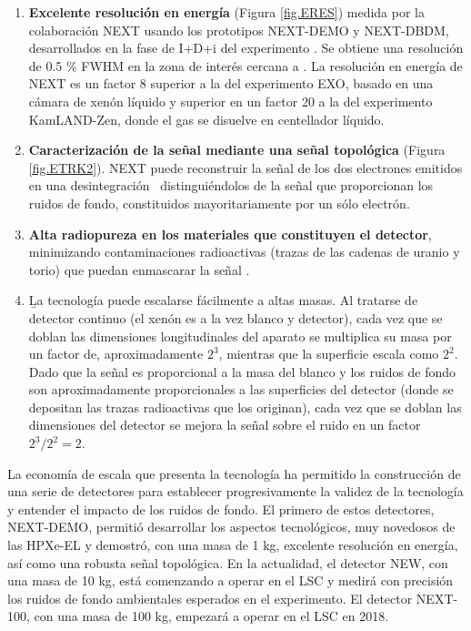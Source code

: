\begin{enumerate}
\item {\bf Excelente resolución en energía} (Figura \ref{fig.ERES}) medida por la colaboración NEXT usando los prototipos NEXT-DEMO y NEXT-DBDM, desarrollados en la fase de I+D+i del experimento . Se obtiene una resolución de 0.5 \% FWHM en la zona de interés cercana a \Qbb. La resolución en energía de NEXT es un factor 8 superior a la del experimento EXO, basado en una cámara de xenón líquido y superior en un factor 20 a la del experimento KamLAND-Zen, donde el gas se disuelve en centellador líquido. 
\item {\bf Caracterización de la señal mediante una señal topológica} (Figura \ref{fig.ETRK2}). NEXT puede reconstruir la señal de los dos electrones emitidos en una desintegración \bb\, distinguiéndolos de la señal que proporcionan los ruidos de fondo, constituidos mayoritariamente por un sólo electrón.
\item {\bf Alta radiopureza en los materiales que constituyen el detector}, minimizando contaminaciones radioactivas (trazas de las cadenas de uranio y torio) que puedan enmascarar la señal \bbonu.
\item {\b La tecnología puede escalarse fácilmente a altas masas}. Al tratarse de detector continuo (el xenón es a la vez blanco y detector), cada vez que se doblan las dimensiones longitudinales del aparato se multiplica su masa por un factor de, aproximadamente $2^3$, mientras que la superficie escala como $2^2$. Dado que la señal es proporcional a la masa del blanco y los ruidos de fondo son aproximadamente proporcionales a las superficies del detector (donde se depositan las trazas radioactivas que los originan), cada vez que se doblan las dimensiones del detector se mejora la señal sobre el ruido en un factor $2^3/2^2 = 2$. 
\end{enumerate}

La economía de escala que presenta la tecnología  ha permitido la construcción de una serie de detectores para establecer progresivamente la validez de la tecnología y entender el impacto de los ruidos de fondo. El primero de estos detectores, NEXT-DEMO, permitió desarrollar los aspectos tecnológicos, muy novedosos de las HPXe-EL y demostró, con una masa de 1 kg, excelente resolución en energía, así como una robusta señal topológica. En la actualidad, el detector NEW, con una masa de 10 kg, está comenzando a operar en el LSC y medirá con precisión los ruidos de fondo ambientales esperados en el experimento. El detector NEXT-100, con una masa de 100 kg, empezará a operar en el LSC en 2018. 


